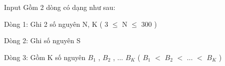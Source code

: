 Input
Gồm 2 dòng có dạng như sau:

Dòng 1: Ghi 2 số nguyên N, K ( 3  $\le$  N  $\le$  300 )

Dòng 2: Ghi số nguyên S

Dòng 3: Gồm K số nguyên $B_{1}$ , $B_{2}$ , ... $B_{K}$ ( $B_{1}$ $<$ $B_{2}$ $<$ ... $<$ $B_{K}$ )
